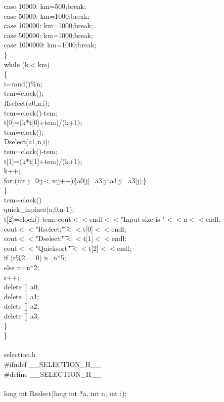 \documentclass{article}
\begin{document}
	    case 10000: km=500;break;\\
	    case 50000: km=1000;break;\\
	    case 100000: km=1000;break;\\
	    case 500000: km=1000;break;\\
	    case 1000000: km=1000;break;\\
	\}\\
	while (k$<$km)\\
	\{\\
	    i=rand()\%n;\\
	    tem=clock();\\
	    Rselect(a0,n,i);\\
	    tem=clock()-tem;\\
	    t[0]=(k*t[0]+tem)/(k+1);\\
	    tem=clock();\\
	    Dselect(a1,n,i);\\
	    tem=clock()-tem;\\
	    t[1]=(k*t[1]+tem)/(k+1);\\
	    k++;\\
        for (int j=0;j$<$n;j++)\{a0[j]=a3[j];a1[j]=a3[j];\}\\
	\}\\
    tem=clock()\\
    quick\_inplace(a,0,n-1);\\
    t[2]=clock()-tem;
	cout$<<$endl$<<$"Input size is "$<<$n$<<$endl;\\
	cout$<<$"Rselect:\t"$<<$t[0]$<<$endl;\\
	cout$<<$"Dselect:\t"$<<$t[1]$<<$endl;\\
	cout$<<$"Quicksort\t"$<<$t[2]$<<$endl;\\
	if (r\%2==0) n=n*5;\\
	else n=n*2;\\
	r++;\\
	delete [] a0;\\
	delete [] a1;\\
	delete [] a2;\\
    delete [] a3;\\
    \}\\
\}\\
\\
selection.h\\
\#ifndef \_\_SELECTION\_H\_\_\\
\#define \_\_SELECTION\_H\_\_\\
\\
long int Rselect(long int *a, int n, int i);\\
\end{document}
